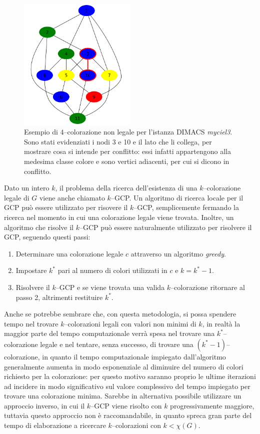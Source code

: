 \documentclass[a4paper,10pt]{article}
\begin{document}
\begin{figure}[hp]
\begin{center}
 \includegraphics[width=0.5\textwidth]{img/err}
\caption[Esempio di colorazione]{Esempio di $4$--colorazione non legale per l'istanza DIMACS \emph{myciel3}. Sono stati evidenziati i nodi 3 e 10 e il lato che li collega, per mostrare cosa si intende per conflitto: essi infatti appartengono alla medesima classe colore e sono vertici adiacenti, per cui si dicono in conflitto.}
\end{center}
\end{figure}

Dato un intero $k$, il problema della ricerca dell'esistenza di una $k$--colorazione legale di $G$ viene anche chiamato $k$--GCP. Un algoritmo di ricerca locale per il GCP può essere utilizzato per risovere il $k$--GCP, semplicemente fermando la ricerca nel momento in cui una colorazione legale viene trovata. Inoltre, un algoritmo che risolve il $k$--GCP può essere naturalmente utilizzato per risolvere il GCP, seguendo questi passi:

\begin{enumerate}
\item Determinare una colorazione legale $c$ attraverso un algoritmo \emph{greedy}.
\item Impostare $k^{*}$  pari al numero di colori utilizzati in $c$ e $k=k^{*}-1$.
\item Risolvere il $k$--GCP e se viene trovata una valida $k$--colorazione ritornare al passo 2, altrimenti restituire $k^{*}$.
\end{enumerate}

Anche se potrebbe sembrare che, con questa metodologia, si possa spendere tempo nel trovare $k$--colorazioni legali con valori non minimi di $k$, in realtà la maggior parte del tempo computazionale verrà spesa nel trovare una $k^{*}$--colorazione legale e nel tentare, senza successo, di trovare una $(k^{*}-1)$--colorazione, in quanto il tempo computazionale impiegato dall'algoritmo generalmente aumenta in modo esponenziale al diminuire del numero di colori richiesto per la colorazione: per questo motivo saranno proprio le ultime iterazioni ad incidere in modo significativo sul valore complessivo del tempo impiegato per trovare una colorazione minima. Sarebbe in alternativa possibile utilizzare un approccio inverso, in cui il $k$--GCP viene risolto con $k$ progressivamente maggiore, tuttavia questo approccio non è raccomandabile, in quanto spreca gran parte del tempo di elaborazione a ricercare $k$--colorazioni con $k<\chi(G)$.
\end{document}
